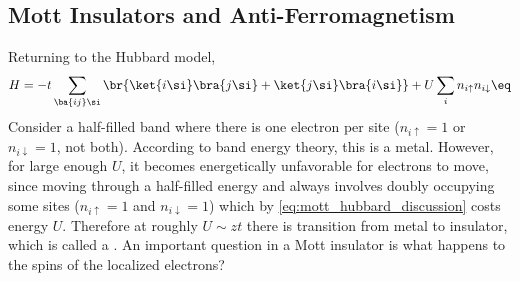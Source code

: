\documentclass{article}
\newcommand{\uu}{\uparrow}
\newcommand{\dd}{\downarrow}
\begin{document}
\subsection{Mott Insulators and Anti-Ferromagnetism}
Returning to the Hubbard model,
\[ H = -t \sum_{\ba{ij}\si} \br{\ket{i \si} \bra{j \si} + \ket{j \si} \bra{i \si}} + U \sum_{i} n_{i \uu} n_{i \dd} \eq \label{eq:mott_hubbard_discussion} \]
Consider a half-filled band where there is one electron per site ($n_{i \uu} = 1$ or $n_{i \dd} = 1$, not both). According to band energy theory, this is a metal. However, for large enough $U$, it becomes energetically unfavorable for electrons to move, since moving through a half-filled energy and always involves doubly occupying some sites ($n_{i \uu} = 1$ and $n_{i \dd} = 1$) which by \cref{eq:mott_hubbard_discussion} costs energy $U$. Therefore at roughly $U \sim zt$ there is transition from metal to insulator, which is called a . An important question in a Mott insulator is what happens to the spins of the localized electrons? \\
\end{document}
